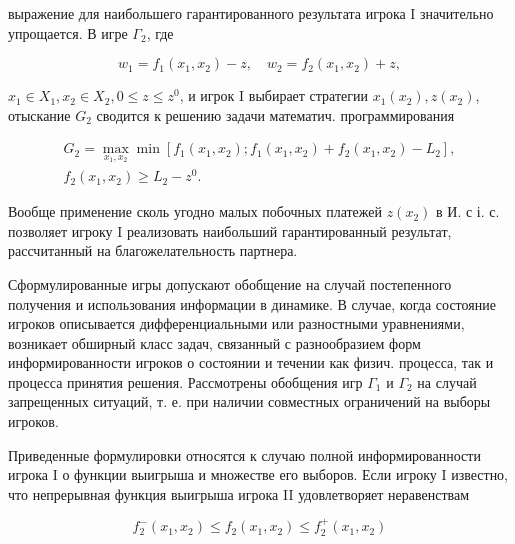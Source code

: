 \documentclass[10pt]{article}
\begin{document}
выражение для наибольшего гарантированного результата игрока I значительно упрощается. В игре $\Gamma_{2}$, где



\[

w_{1}=f_{1}\left(x_{1}, x_{2}\right)-z, \quad w_{2}=f_{2}\left(x_{1}, x_{2}\right)+z,

\]



$x_{1} \in X_{1}, x_{2} \in X_{2}, 0 \leqslant z \leqslant z^{0}$, и игрок I выбирает стратегии $x_{1}\left(x_{2}\right), z\left(x_{2}\right)$, отыскание $G_{2}$ сводится к решению задачи математич. программирования



\[

\begin{gathered}

G_{2}=\max _{x_{1}, x_{2}} \min \left[f_{1}\left(x_{1}, x_{2}\right) ; f_{1}\left(x_{1}, x_{2}\right)+f_{2}\left(x_{1}, x_{2}\right)-L_{2}\right], \\

f_{2}\left(x_{1}, x_{2}\right) \geqslant L_{2}-z^{0} .

\end{gathered}

\]



Вообще применение сколь угодно малых побочных платежей $z\left(x_{2}\right)$ в И. с і. с. позволяет игроку I реализовать наибольший гарантированный результат, рассчитанный на благожелательность партнера.



Сформулированные игры допускают обобщение на случай постепенного получения и использования информации в динамике. В случае, когда состояние игроков описывается дифференциальными или разностными уравнениями, возникает обширный класс задач, связанный с разнообразием форм информированности игроков о состоянии и течении как физич. процесса, так и процесса принятия решения. Рассмотрены обобщения игр $\Gamma_{1}$ и $\Gamma_{2}$ на случай запрещенных ситуаций, т. е. при наличии совместных ограничений на выборы игроков.



Приведенные формулировки относятся к случаю полной информированности игрока I о функции выигрыша и множестве его выборов. Если игроку I известно, что непрерывная функция выигрыша игрока II удовлетворяет неравенствам



\[

f_{2}^{-}\left(x_{1}, x_{2}\right) \leqslant f_{2}\left(x_{1}, x_{2}\right) \leqslant f_{2}^{+}\left(x_{1}, x_{2}\right)

\]
\end{document}

